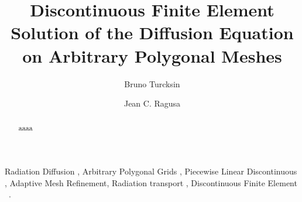 \documentclass[preprint,10pt]{elsarticle}
\renewcommand{\(}{\left(}
\renewcommand{\)}{\right)}
\renewcommand{\[}{\left[}
\renewcommand{\]}{\right]}
\begin{document}
 

\begin{frontmatter}



\title{Discontinuous Finite Element Solution of the Diffusion Equation on Arbitrary Polygonal Meshes}


\author{Bruno Turcksin }

\address[label1]{Department of Nuclear Engineering, Texas A\&M University 
  College Station, TX 77843, USA }

\author{Jean C. Ragusa}


\begin{abstract}

aaaa

\end{abstract}

\begin{keyword}
  Radiation Diffusion \sep
	Arbitrary Polygonal Grids \sep
  Piecewise Linear Discontinuous \sep
  Adaptive Mesh Refinement\sep
  Radiation transport \sep
  Discontinuous Finite Element \, .
\end{keyword}

\end{frontmatter}
\end{document}
